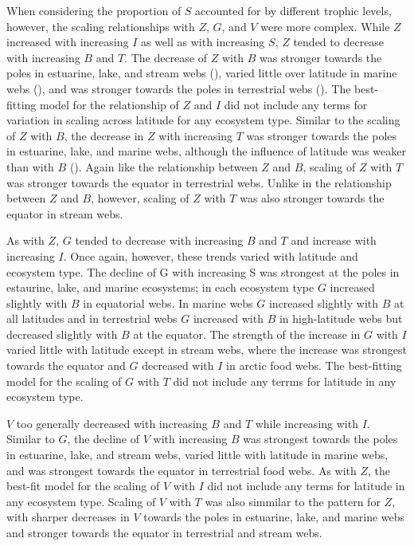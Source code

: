 \documentclass[12pt]{article}
\begin{document}
When considering the proportion of $S$ accounted for by different trophic
levels, however, the scaling relationships with $Z$, $G$, and $V$ were more
complex. While $Z$ increased with increasing $I$ as well as with increasing
$S$, $Z$ tended to decrease with increasing $B$ and $T$. The decrease of $Z$
with $B$ was stronger towards the poles in estuarine, lake, and stream webs
(), varied little over latitude in marine webs (), and was stronger towards
the poles in terrestrial webs (). The best-fitting model for the relationship
of $Z$ and $I$ did not include any terms for variation in scaling across
latitude for any ecosystem type. Similar to the scaling of $Z$ with $B$, the
decrease in $Z$ with increasing $T$ was stronger towards the poles in
estuarine, lake, and marine webs, although the influence of latitude was
weaker than with $B$ (). Again like the relationship between $Z$ and $B$,
scaling of $Z$ with $T$ was stronger towards the equator in terrestrial webs.
Unlike in the relationship between $Z$ and $B$, however, scaling of $Z$ with
$T$ was also stronger towards the equator in stream webs.


As with $Z$, $G$ tended to decrease with increasing $B$ and $T$ and increase
with increasing $I$. Once again, however, these trends varied with latitude
and ecosystem type. The decline of G with increasing S was strongest at the
poles in estaurine, lake, and marine ecosystems; in each ecosystem type $G$
increased slightly with $B$ in equatorial webs. In marine webs $G$ increased
slightly with $B$ at all latitudes and in terrestrial webs $G$ increased with
$B$ in high-latitude webs but decreased slightly with $B$ at the equator. The
strength of the increase in $G$ with $I$ varied little with latitude except in
stream webs, where the increase was strongest towards the equator and $G$
decreased with $I$ in arctic food webs. The best-fitting model for the scaling
of $G$ with $T$ did not include any terrms for latitude in any ecosystem type.


$V$ too generally decreased with increasing $B$ and $T$ while increasing with
$I$. Similar to $G$, the decline of $V$ with increasing $B$ was strongest
towards the poles in estuarine, lake, and stream webs, varied little with
latitude in marine webs, and was strongest towards the equator in terrestrial
food webs. As with $Z$, the best-fit model for the scaling of $V$ with $I$ did
not include any terms for latitude in any ecosystem type. Scaling of $V$ with
$T$ was also simmilar to the pattern for $Z$, with sharper decreases in $V$
towards the poles in estuarine, lake, and marine webs and stronger towards the
equator in terrestrial and stream webs.
\end{document}
